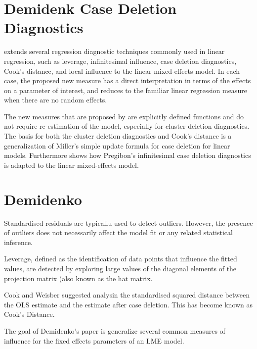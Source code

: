 \documentclass[MAIN.tex]{subfiles}
\begin{document}
\section{Demidenk Case Deletion Diagnostics}
\citet{Demi} extends several regression diagnostic techniques commonly used in linear regression, such as leverage, infinitesimal influence, case deletion diagnostics, Cook's distance, and local influence to the linear mixed-effects model. In each case, the proposed new measure has a direct interpretation in terms of the effects on a parameter of interest, and reduces to the familiar linear regression measure when there are no random effects.

The new measures that are proposed by \citet{Demi} are explicitly defined functions and do not require re-estimation of the model, especially for cluster deletion diagnostics. The basis for both the cluster deletion diagnostics and Cook's distance is a generalization of Miller's simple update formula for case deletion for linear models. Furthermore \citet{Demi} shows how Pregibon's infinitesimal case deletion diagnostics is adapted to the linear mixed-effects model. 

\section{ Demidenko}

Standardised residuals are typicallu used to detect outliers. However, the presence of outliers does not necessarily affect the model fit or any related statistical inference.

Leverage, defined as the identification of data points that influence the fitted values, are detected by exploring large values of the diagonal elements of the projection matrix (also known as the hat matrix.

Cook and Weisber suggested analysin the standardised squared distance between the OLS estimate and the estimate after case deletion. This has become known as Cook's Distance.

The goal of Demidenko's paper is generalize several common measures of influence for the fixed effects parameters of an LME model.

\end{document}
